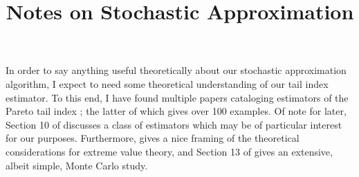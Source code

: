 \documentclass{article}
\title{Notes on Stochastic Approximation}
\date{}
\begin{document}
\maketitle

In order to say anything useful theoretically about our stochastic approximation algorithm, I expect to need some theoretical understanding of our tail index estimator. To this end, I have found multiple papers cataloging estimators of the Pareto tail index \citep{Gom15,Fed20}; the latter of which gives over 100 examples. Of note for later, Section 10 of \citet{Fed20} discusses a class of estimators which may be of particular interest for our purposes. Furthermore, \citet{Gom15} gives a nice framing of the theoretical considerations for extreme value theory, and Section 13 of \citet{Fed20} gives an extensive, albeit simple, Monte Carlo study.







\end{document}
